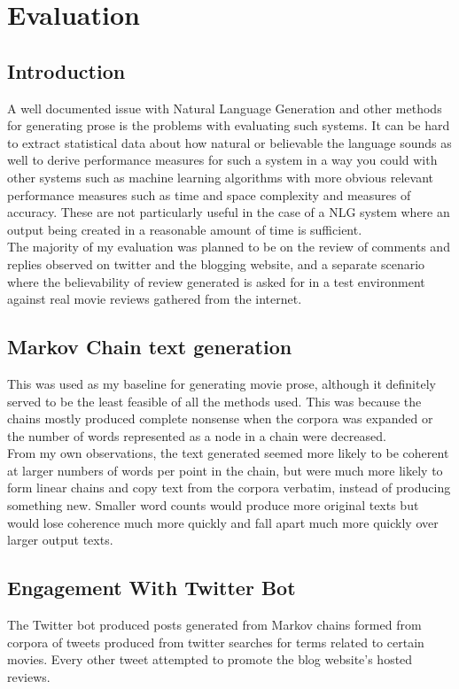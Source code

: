 \chapter{\label{ch:6-evaluation} Evaluation}


\section{Introduction}
A well documented issue with Natural Language Generation and other methods for generating prose is the problems with evaluating such systems. It can be hard to extract statistical data about how natural or believable the language sounds as well to derive performance measures for such a system in a way you could with other systems such as machine learning algorithms with more obvious relevant performance measures such as time and space complexity and measures of accuracy. These are not particularly useful in the case of a NLG system where an output being created in a reasonable amount of time is sufficient.\\

The majority of my evaluation was planned to be on the review of comments and replies observed on twitter and the blogging website, and a separate scenario where the believability of review generated is asked for in a test environment against real movie reviews gathered from the internet.

\section{Markov Chain text generation}
This was used as my baseline for generating movie prose, although it definitely served to be the least feasible of all the methods used. This was because the chains mostly produced complete nonsense when the corpora was expanded or the number of words represented as a node in a chain were decreased.\\
From my own observations, the text generated seemed more likely to be coherent at larger numbers of words per point in the chain, but were much more likely to form linear chains and copy text from the corpora verbatim, instead of producing something new. Smaller word counts would produce more original texts but would lose coherence much more quickly and fall apart much more quickly over larger output texts.

\section{Engagement With Twitter Bot}
The Twitter bot produced posts generated from Markov chains formed from corpora of tweets produced from twitter searches for terms related to certain movies. Every other tweet attempted to promote the blog website's hosted reviews.

